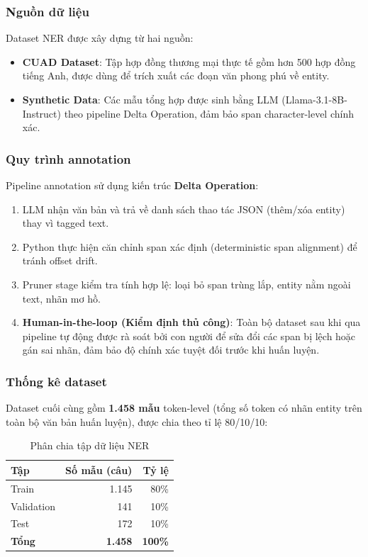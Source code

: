 \subsubsection{Nguồn dữ liệu}

Dataset NER được xây dựng từ hai nguồn:
\begin{itemize}
    \item \textbf{CUAD Dataset}: Tập hợp đồng thương mại thực tế gồm hơn 500 hợp đồng tiếng Anh, được dùng để trích xuất các đoạn văn phong phú về entity.
    \item \textbf{Synthetic Data}: Các mẫu tổng hợp được sinh bằng LLM (Llama-3.1-8B-Instruct) theo pipeline Delta Operation, đảm bảo span character-level chính xác.
\end{itemize}

\subsubsection{Quy trình annotation}

Pipeline annotation sử dụng kiến trúc \textbf{Delta Operation}:
\begin{enumerate}
    \item LLM nhận văn bản và trả về danh sách thao tác JSON (thêm/xóa entity) thay vì tagged text.
    \item Python thực hiện căn chỉnh span xác định (deterministic span alignment) để tránh offset drift.
    \item Pruner stage kiểm tra tính hợp lệ: loại bỏ span trùng lắp, entity nằm ngoài text, nhãn mơ hồ.
    \item \textbf{Human-in-the-loop (Kiểm định thủ công)}: Toàn bộ dataset sau khi qua pipeline tự động được rà soát bởi con người để sửa đổi các span bị lệch hoặc gán sai nhãn, đảm bảo độ chính xác tuyệt đối trước khi huấn luyện.
\end{enumerate}

\subsubsection{Thống kê dataset}

Dataset cuối cùng gồm \textbf{1.458 mẫu} token-level (tổng số token có nhãn entity trên toàn bộ văn bản huấn luyện), được chia theo tỉ lệ 80/10/10:

\begin{table}[H]
    \centering
    \caption{Phân chia tập dữ liệu NER}
    \label{tab:ner_split}
    \begin{tabular}{|l|r|r|}
        \hline
        \textbf{Tập} & \textbf{Số mẫu (câu)} & \textbf{Tỷ lệ} \\ \hline
        Train & 1.145 & 80\% \\ \hline
        Validation & 141 & 10\% \\ \hline
        Test & 172 & 10\% \\ \hline
        \textbf{Tổng} & \textbf{1.458} & \textbf{100\%} \\ \hline
    \end{tabular}
\end{table}

